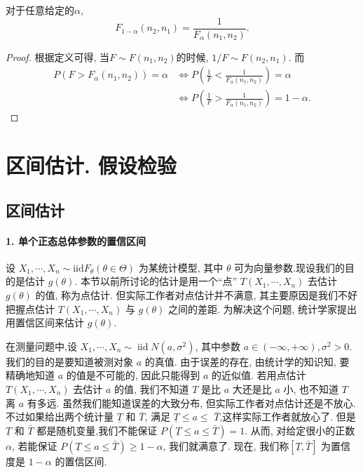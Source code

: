 \begin{corollary}
    对于任意给定的$\alpha$, 
    \[
        F_{1-\alpha}(n_2, n_1)=\frac{1}{F_\alpha(n_1, n_2)}.     
    \]
\end{corollary}

\begin{proof}
    根据定义可得, 当$F\sim F(n_1, n_2)$的时候, $1/F\sim F(n_2, n_1)$. 而
    \[
        \begin{aligned}
            P(F>F_\alpha(n_1, n_2))=\alpha &\iff P(\frac1F<\frac1{F_\alpha(n_1, n_2)})=\alpha \\
            &\iff P(\frac1F>\frac1{F_\alpha(n_1, n_2)})=1-\alpha .
        \end{aligned}
    \]
\end{proof}

\section{区间估计. 假设检验}

\subsection{区间估计}

\paragraph{1. 单个正态总体参数的置信区间}
设 $X_1, \cdots, X_n \sim \mathrm{iid} F_\theta(\theta \in \Theta)$ 为某统计模型, 其中 $\theta$ 可为向量参数.现设我们的目的是估计 $g(\theta)$. 本节以前所讨论的估计是用一个``点'' $T\left(X_1, \cdots, X_n\right)$ 去估计 $g(\theta)$ 的值, 称为点估计. 但实际工作者对点估计并不满意, 其主要原因是我们不好把握点估计 $T\left(X_1, \cdots, X_n\right)$ 与 $g(\theta)$ 之间的差距. 为解决这个问题, 统计学家提出用置信区间来估计 $g(\theta)$. 

\begin{example}
    在测量问题中,设 $X_1, \cdots, X_n \sim \operatorname{iid} N\left(a, \sigma^2\right)$, 其中参数 $a \in(-\infty,+\infty), \sigma^2>0$. 我们的目的是要知道被测对象 $a$ 的真值. 由于误差的存在, 由统计学的知识知, 要精确地知道 $a$ 的值是不可能的, 因此只能得到 $a$ 的近似值. 若用点估计 $T\left(X_1, \cdots, X_n\right)$ 去估计 $a$ 的值, 我们不知道 $T$ 是比 $a$ 大还是比 $a$ 小, 也不知道 $T$ 离 $a$ 有多远. 虽然我们能知道误差的大致分布, 但实际工作者对点估计还是不放心. 不过如果给出两个统计量 $\underline T$ 和 $\bar{T}$, 满足 $\underline T \leq a \leq$ $\bar{T}$,这样实际工作者就放心了. 但是 $\underline{T}$ 和 $\bar{T}$ 都是随机变量,我们不能保证 $P(\underline{T} \leq a \leq \bar{T})=1$. 从而, 对给定很小的正数 $\alpha$, 若能保证 $P(\underline{T} \leq a \leq \bar T)\geq 1-\alpha $, 我们就满意了. 现在, 我们称$[\underline T, \bar{T}]$ 为置信度是 $1-\alpha$ 的置信区间.
\end{example}

